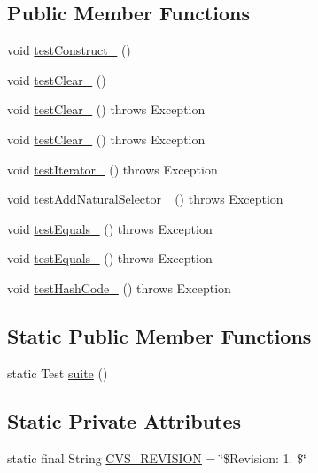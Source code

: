 \subsection*{Public Member Functions}
\begin{DoxyCompactItemize}
\item 
void \hyperlink{classorg_1_1jgap_1_1impl_1_1_chain_of_selectors_test_a7f91133438f695752e4bb621c645d196}{test\-Construct\-\_} ()
\item 
void \hyperlink{classorg_1_1jgap_1_1impl_1_1_chain_of_selectors_test_a7ca8517c401deb766ed048444e3f9800}{test\-Clear\-\_} ()
\item 
void \hyperlink{classorg_1_1jgap_1_1impl_1_1_chain_of_selectors_test_a8723793678cf911fe734e6a95abc0873}{test\-Clear\-\_} ()  throws Exception 
\item 
void \hyperlink{classorg_1_1jgap_1_1impl_1_1_chain_of_selectors_test_a58caeed3dff52d7ba18b62b19448ce04}{test\-Clear\-\_} ()  throws Exception 
\item 
void \hyperlink{classorg_1_1jgap_1_1impl_1_1_chain_of_selectors_test_a5c89fa739a3a78eb530a7da96259da33}{test\-Iterator\-\_} ()  throws Exception 
\item 
void \hyperlink{classorg_1_1jgap_1_1impl_1_1_chain_of_selectors_test_a7c88877b669d48a3ff0bd49bc51e5608}{test\-Add\-Natural\-Selector\-\_} ()  throws Exception 
\item 
void \hyperlink{classorg_1_1jgap_1_1impl_1_1_chain_of_selectors_test_a2a61fade1cbf2211a2339a2155191839}{test\-Equals\-\_} ()  throws Exception 
\item 
void \hyperlink{classorg_1_1jgap_1_1impl_1_1_chain_of_selectors_test_a18846186b82214f56b429252f5d8a030}{test\-Equals\-\_} ()  throws Exception 
\item 
void \hyperlink{classorg_1_1jgap_1_1impl_1_1_chain_of_selectors_test_aa4c3da9bcbbafbb1cfc6827a2128802b}{test\-Hash\-Code\-\_} ()  throws Exception 
\end{DoxyCompactItemize}
\subsection*{Static Public Member Functions}
\begin{DoxyCompactItemize}
\item 
static Test \hyperlink{classorg_1_1jgap_1_1impl_1_1_chain_of_selectors_test_a1f6e73f171171828a3adac47548e877a}{suite} ()
\end{DoxyCompactItemize}
\subsection*{Static Private Attributes}
\begin{DoxyCompactItemize}
\item 
static final String \hyperlink{classorg_1_1jgap_1_1impl_1_1_chain_of_selectors_test_a6cd5d9470440395077911a42b5272630}{C\-V\-S\-\_\-\-R\-E\-V\-I\-S\-I\-O\-N} = \char`\"{}\$Revision\-: 1. \$\char`\"{}
\end{DoxyCompactItemize}
